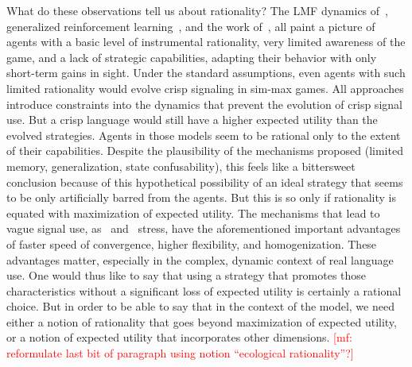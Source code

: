 \documentclass[a4paper]{article}
\newcommand{\mf}[1]{\textcolor{Red}{[mf: #1]}}
\begin{document}
What do these observations tell us about rationality?
The LMF dynamics of~\textcite{franke_vagueness_2011}, generalized reinforcement learning~\parencite{oconnor_evolution_2014}, and the work of~\textcite{franke_vagueness_2017}, all paint a picture of agents with a basic level of instrumental rationality, very limited awareness of the game, and a lack of strategic capabilities, adapting their behavior with only short-term gains in sight.
Under the standard assumptions, even agents with such limited rationality would evolve crisp signaling in sim-max games.
All approaches introduce constraints into the dynamics that prevent the evolution of crisp signal use.
But a crisp language would still have a higher expected utility than the evolved strategies.
Agents in those models seem to be rational only to the extent of their capabilities.
Despite the plausibility of the mechanisms proposed (limited memory, generalization, state confusability), this feels like a bittersweet conclusion because of this hypothetical possibility of an ideal strategy that seems to be only artificially barred from the agents.
But this is so only if rationality is equated with maximization of expected utility.
The mechanisms that lead to vague signal use, as~\textcite{oconnor_evolution_2014} and~\textcite{franke_vagueness_2017} stress, have the aforementioned important advantages of faster speed of convergence, higher flexibility, and homogenization.
These advantages matter, especially in the complex, dynamic context of real language use.
One would thus like to say that using a strategy that promotes those characteristics without a significant loss of expected utility is certainly a rational choice.
But in order to be able to say that in the context of the model, we need either a notion of rationality that goes beyond maximization of expected utility, or a notion of expected utility that incorporates other dimensions.
\mf{reformulate last bit of paragraph using notion ``ecological rationality''?}
\end{document}

